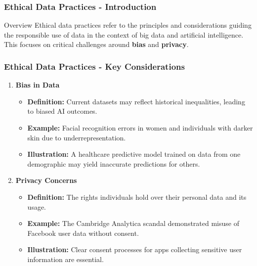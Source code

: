 \documentclass[aspectratio=169]{beamer}
\begin{document}
\begin{frame}[fragile]
    \frametitle{Ethical Data Practices - Introduction}
    \begin{block}{Overview}
        Ethical data practices refer to the principles and considerations guiding the responsible use of data in the context of big data and artificial intelligence. 
        This focuses on critical challenges around \textbf{bias} and \textbf{privacy}.
    \end{block}
\end{frame}

\begin{frame}[fragile]
    \frametitle{Ethical Data Practices - Key Considerations}
    \begin{enumerate}
        \item \textbf{Bias in Data}
            \begin{itemize}
                \item \textbf{Definition:} Current datasets may reflect historical inequalities, leading to biased AI outcomes.
                \item \textbf{Example:} Facial recognition errors in women and individuals with darker skin due to underrepresentation.
                \item \textbf{Illustration:} A healthcare predictive model trained on data from one demographic may yield inaccurate predictions for others.
            \end{itemize}
        
        \item \textbf{Privacy Concerns}
            \begin{itemize}
                \item \textbf{Definition:} The rights individuals hold over their personal data and its usage.
                \item \textbf{Example:} The Cambridge Analytica scandal demonstrated misuse of Facebook user data without consent.
                \item \textbf{Illustration:} Clear consent processes for apps collecting sensitive user information are essential.
            \end{itemize}
    \end{enumerate}
\end{frame}
\end{document}

